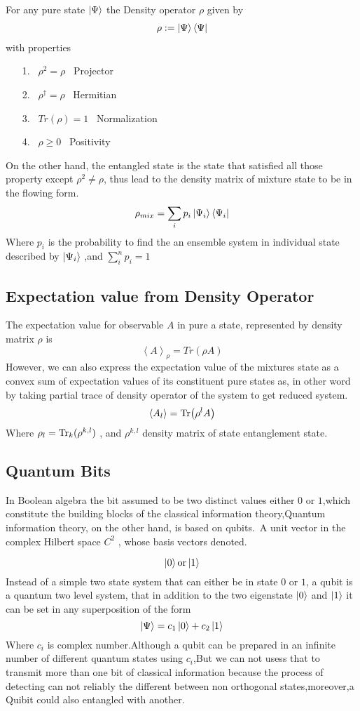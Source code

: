 For any pure state $\ket{\Psi}$ the Density operator $\rho$ given by
\begin{align}
\rho:=\ket{\Psi}\bra{\Psi}
\end{align}
with properties 
\begin{itemize}
\item[1.] ~$\rho^2=\rho$ ~Projector 
\item [2.]~$\rho^\dagger =\rho$ ~Hermitian
\item [3.]~$Tr(\rho)=1$ ~Normalization
\item [4.]~$\rho \geqslant 0$ ~Positivity
\end{itemize}
On the other hand, the entangled state is the state that satisfied all those property except $\rho^2\neq\rho$, thus lead to the density matrix of mixture state to be in the flowing form.
\begin{equation}
\rho_{mix }= \sum_{i} p_i \ket{\Psi_i}\bra{\Psi_i}
\end{equation}
Where $p_i$ is the probability to find the an ensemble  system in individual state  described by $\ket{\Psi_i} $ ,and $\sum_{i}^n p_i=1$

\subsection{Expectation value  from Density Operator}

The expectation value for observable $A$ in pure a state, represented  by density matrix $\rho$ is
$$\left<A\right>_\rho=Tr(\rho A)$$
However, we can  also express the expectation value of the mixtures state as a convex sum of expectation values of its constituent pure states as, in other word by taking  partial  trace  of density operator of the system to  get reduced system. 
$$\left<A_l\right>= \Tr(\rho^l A)$$
Where $\rho_l=\Tr_k(\rho^{k,l})$ , and $\rho^{k,l}$  density matrix of state entanglement state.


\subsection{Quantum Bits}

In Boolean algebra the bit assumed to be  two distinct values either $0 $ or $1$,which constitute the building blocks of the classical information theory,Quantum information theory, on the other hand, is based on qubits.\citep{nielsen2002quantum}~A unit vector in the  complex Hilbert space $C^2$ , whose basis vectors denoted.

\begin{equation}
\ket{0}\text{or}\ket{1}
\end{equation}
Instead of a simple two state system that can either be in state $0$ or $1$, a qubit is a quantum two level system, that in addition to the two eigenstate $\ket{0}$ and $\ket{1}$ it can be set in any superposition of the form
$$\ket{\Psi}=c_1\ket{0}+c_2\ket{1}$$
Where $c_i$ is complex number.Although a qubit can be prepared in an infinite number of different quantum states using $c_i$,But we can  not usess that to transmit more than one bit of classical information because the process of detecting can not reliably the different between non orthogonal states,moreover,a Quibit could also entangled with another.
